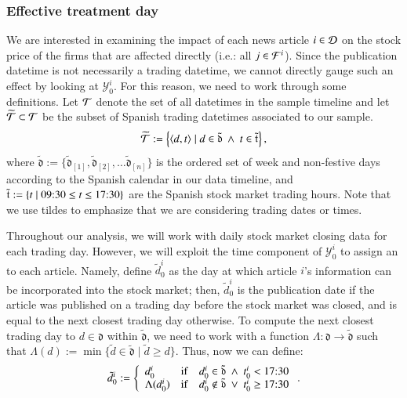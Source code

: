 \subsubsection*{Effective treatment day}
We are interested in examining the impact of each news article $i\in\D$ on the stock price of the firms that are affected directly (i.e.: all $j\in\F^i$). Since the publication datetime is not necessarily a trading datetime, we cannot directly gauge such an effect by looking at $\mathcal Y_0^i$. 
For this reason, we need to work through some definitions. 
Let $\T$ denote the set of all datetimes in the sample timeline and let $\widetilde{\T}\subset \T$ be the subset of Spanish trading datetimes associated to our sample.
\begin{align*}
\widetilde{\T} := 
\3{\angl{d,t} \mid d \in \tilde{\mathfrak d} ~\wedge~ t\in \tilde{\mathfrak t}}
,
\end{align*}
where 
$
\tilde{\mathfrak{d}}:=\{\tilde{\mathfrak{d}}_{[1]},\tilde{\mathfrak{d}}_{[2]}, \ldots \tilde{\mathfrak{d}}_{[n]}\}
$
is the ordered set of week and non-festive days according to the Spanish calendar in our data timeline,
and 
$\tilde{\mathfrak t}:=
\{t \mid \t{09:30} \leq t \leq  \t{17:30}\}
$
 are the Spanish stock market trading hours. 
Note that we use tildes to emphasize that we are considering trading dates or times. 

\bx 
Throughout our analysis, we will work with daily stock market closing data for each trading day. However, we will exploit the time component of $\mathcal Y_0^i$ to assign an  to each article. Namely, define $\tilde d_0^i$ as the day at which article $i$'s information can be incorporated into the stock market; then, $\tilde d_0^i$ is the publication date if the article was published on a trading day before the stock market was closed, and is equal to the next closest trading day otherwise. 
To compute the next closest trading day to $d\in\mathfrak d$ within $\tilde{\mathfrak d}$, we need to work with a function $\Lambda:\mathfrak d \to \tilde{\mathfrak d}$ such that  
$\Lambda(d) 
:= 
\min \{ \tilde{d} \in \tilde{\mathfrak{d}} \mid \tilde{d} \geq d \}$. 
Thus, now we can define:
\begin{align*}
\tilde{d}_0^i :=
\mycases{llll}{
d_0^i & \IF & d_0^i \in \tilde{\mathfrak d} ~\wedge~t_0^i < \t{17:30}
\\
\Lambda(d_0^i)
& \IF & d_0^i \not \in \tilde{\mathfrak d} ~\vee~t_0^i \geq  \t{17:30}
}
.
\end{align*}

